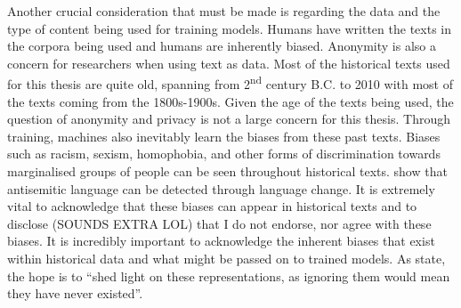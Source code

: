 Another crucial consideration that must be made is regarding the data and the type of content being used for training models. Humans have written the texts in the corpora being used and humans are inherently biased. Anonymity is also a concern for researchers when using text as data. Most of the historical texts used for this thesis are quite old, spanning from 2\textsuperscript{nd} century B.C. to 2010 with most of the texts coming from the 1800s-1900s. Given the age of the texts being used, the question of anonymity and privacy is not a large concern for this thesis. Through training, machines also inevitably learn the biases from these past texts. Biases such as racism, sexism, homophobia, and other forms of discrimination towards marginalised groups of people can be seen throughout historical texts. \citet{tripodi-etal-2019-tracing} show that antisemitic language can be detected through language change. It is extremely vital to acknowledge that these biases can appear in historical texts and to disclose (SOUNDS EXTRA LOL) that I do not endorse, nor agree with these biases. It is incredibly important to acknowledge the inherent biases that exist within historical data and what might be passed on to trained models. As \citet{hengchen-tahmasebi_2021-swedishdiachronic} state, the hope is to “shed light on these representations, as ignoring them would mean they have never existed”. 
